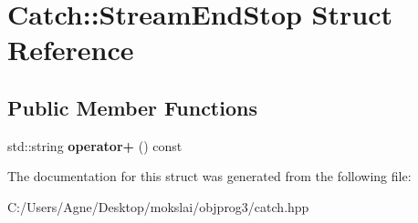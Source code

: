\hypertarget{struct_catch_1_1_stream_end_stop}{}\section{Catch\+:\+:Stream\+End\+Stop Struct Reference}
\label{struct_catch_1_1_stream_end_stop}
\subsection*{Public Member Functions}
\begin{DoxyCompactItemize}
\item 
\mbox{\label{struct_catch_1_1_stream_end_stop_a4a518f0342a381074821d5bda2651401}} 
std\+::string {\bfseries operator+} () const
\end{DoxyCompactItemize}


The documentation for this struct was generated from the following file\+:\begin{DoxyCompactItemize}
\item 
C\+:/\+Users/\+Agne/\+Desktop/mokslai/objprog3/catch.\+hpp\end{DoxyCompactItemize}
